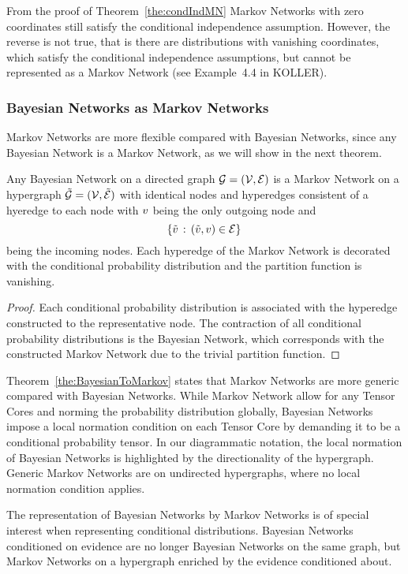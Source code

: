 From the proof of Theorem~\ref{the:condIndMN} Markov Networks with zero coordinates still satisfy the conditional independence assumption.
However, the reverse is not true, that is there are distributions with vanishing coordinates, which satisfy the conditional independence assumptions, but cannot be represented as a Markov Network (see Example~4.4 in KOLLER).

\subsubsection{Bayesian Networks as Markov Networks}

Markov Networks are more flexible compared with Bayesian Networks, since any Bayesian Network is a Markov Network, as we will show in the next theorem.

\begin{theorem}\label{the:BayesianToMarkov}
	Any Bayesian Network on a directed graph $\mathcal{G}=(\mathcal{V},\mathcal{E})$ is a Markov Network on a hypergraph $\tilde{\mathcal{G}}=(\mathcal{V},\tilde{\mathcal{E}})$ with identical nodes and hyperedges consistent of  a hyeredge to each node with $v$ being the only outgoing node and
		\[  \{\tilde{v} \, : \, (\tilde{v},v) \in \mathcal{E}\} \,  \]
	being the incoming nodes.
	Each hyperedge of the Markov Network is decorated with the conditional probability distribution and the partition function is vanishing.
\end{theorem}
\begin{proof}
	Each conditional probability distribution is associated with the hyperedge constructed to the representative node.
	The contraction of all conditional probability distributions is the Bayesian Network, which corresponds with the constructed Markov Network due to the trivial partition function.
\end{proof}

Theorem~\ref{the:BayesianToMarkov} states that Markov Networks are more generic compared with Bayesian Networks.
While Markov Network allow for any Tensor Cores and norming the probability distribution globally, Bayesian Networks impose a local normation condition on each Tensor Core by demanding it to be a conditional probability tensor.
In our diagrammatic notation, the local normation of Bayesian Networks is highlighted by the directionality of the hypergraph.
Generic Markov Networks are on undirected hypergraphs, where no local normation condition applies.

The representation of Bayesian Networks by Markov Networks is of special interest when representing conditional distributions.
Bayesian Networks conditioned on evidence are no longer Bayesian Networks on the same graph, but Markov Networks on a hypergraph enriched by the evidence conditioned about.








